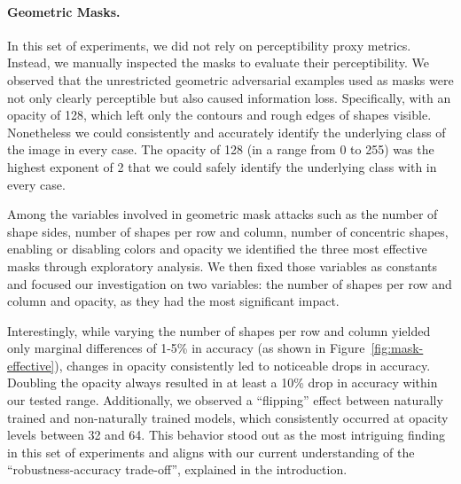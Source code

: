 \documentclass[a4paper, oneside]{discothesis}
\begin{document}
\paragraph{Geometric Masks.}

In this set of experiments, we did not rely on perceptibility proxy metrics. Instead, we manually inspected the masks to evaluate their perceptibility. We observed that the unrestricted geometric adversarial examples used as masks were not only clearly perceptible but also caused information loss. Specifically, with an opacity of 128, which left only the contours and rough edges of shapes visible. Nonetheless we could consistently and accurately identify the underlying class of the image in every case. The opacity of 128 (in a range from 0 to 255) was the highest exponent of 2 that we could safely identify the underlying class with in every case.

Among the variables involved in geometric mask attacks \textendash{} such as the number of shape sides, number of shapes per row and column, number of concentric shapes, enabling or disabling colors and opacity \textendash{} we identified the three most effective masks through exploratory analysis. We then fixed those variables as constants and focused our investigation on two variables: the number of shapes per row and column and opacity, as they had the most significant impact.

Interestingly, while varying the number of shapes per row and column yielded only marginal differences of 1-5\% in accuracy (as shown in Figure~\ref{fig:mask-effective}), changes in opacity consistently led to noticeable drops in accuracy. Doubling the opacity always resulted in at least a 10\% drop in accuracy within our tested range. Additionally, we observed a ``flipping'' effect between naturally trained and non-naturally trained models, which consistently occurred at opacity levels between 32 and 64. This behavior stood out as the most intriguing finding in this set of experiments and aligns with our current understanding of the ``robustness-accuracy trade-off'', explained in the introduction.
\end{document}
